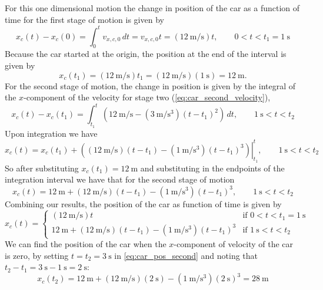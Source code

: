 \documentclass[solutions]{esg8012exam}
\begin{document}
    For this one dimensional motion the change in position of the car as a function of time for the first stage of motion is given by
    $$x_c(t) - x_c(0) = \int_0^t v_{x,c,0}\,dt = v_{x,c,0}t = (\SI{12}{\meter\per\second})t,\qquad 0 < t < t_1 = \SI{1}{\second}$$
    Because the car started at the origin, the position at the end of the interval is given by
    $$x_c(t_1) = (\SI{12}{\meter\per\second})t_1 = (\SI{12}{\meter\per\second})(\SI{1}{\second}) = \SI{12}{\meter}.$$
    For the second stage of motion, the change in position is given by the integral of the $x$-component of the velocity for stage two (\autoref{eq:car_second_velocity}),
    $$x_c(t) - x_c(t_1) = \int_{t_1}^t \left( \SI{12}{\meter\per\second} - (\SI{3}{\meter\per\second\cubed})(t - t_1)^2\right)\,dt,\qquad \SI{1}{\second} < t < t_2$$
    Upon integration we have
    $$x_c(t) = x_c(t_1) + \left.\left( (\SI{12}{\meter\per\second})(t - t_1) - (\SI{1}{\meter\per\second\cubed})(t - t_1)^3\right)\right|_{t_1}^t,\qquad \SI{1}{\second} < t < t_2$$
    So after substituting $x_c(t_1) = \SI{12}{\meter}$ and substituting in the endpoints of the integration interval we have that for the second stage of motion
    \begin{equation}
      x_c(t) = \SI{12}{\meter} + (\SI{12}{\meter\per\second})(t - t_1) - (\SI{1}{\meter\per\second\cubed})(t - t_1)^3,\qquad \SI{1}{\second} < t < t_2 \label{eq:car_pos_second}
    \end{equation}
    Combining our results, the position of the car as function of time is given by
    \begin{equation}
      x_c(t) = \begin{cases}
                (\SI{12}{\meter\per\second})t & \text{if }0 < t < t_1 = \SI{1}{\second} \\
                \SI{12}{\meter} + (\SI{12}{\meter\per\second})(t - t_1) - (\SI{1}{\meter\per\second\cubed})(t - t_1)^3 & \text{if }\SI{1}{\second} < t < t_2
               \end{cases}
    \end{equation}
    We can find the position of the car when the $x$-component of velocity of the car is zero, by setting $t = t_2 = \SI{3}{\second}$ in \autoref{eq:car_pos_second} and noting that $t_2 - t_1 = \SI{3}{\second} - \SI{1}{\second} = \SI{2}{\second}$:
    \begin{equation}
      x_c(t_2) = \SI{12}{\meter} + (\SI{12}{\meter\per\second})(\SI{2}{\second}) - (\SI{1}{\meter\per\second\cubed})(\SI{2}{\second})^3 = \SI{28}{\meter} \label{eq:car_final_position}
    \end{equation}
\end{document}
